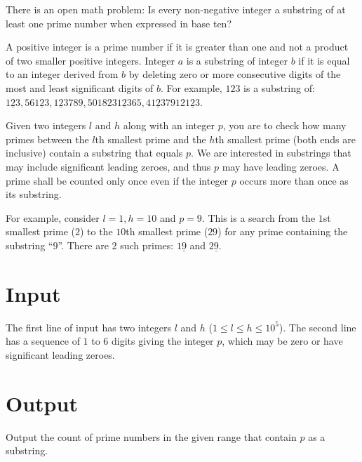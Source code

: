 
There is an open math problem: Is every non-negative integer a substring of at least one prime number when expressed in base ten?

A positive integer is a prime number if it is greater than one and not a product of two smaller positive integers.
Integer $a$ is a substring of integer $b$ if it is equal to an integer derived from $b$ by deleting zero or more consecutive digits of the most and least significant digits of $b$.
For example, $123$ is a substring of: $\underline{123}, 56\underline{123}, \underline{123}789, 501823\underline{123}65, 4\underline{123}7912\underline{123}$.

Given two integers $l$ and $h$ along with an integer $p$, 
you are to check how many primes between the $l$th smallest prime and the $h$th smallest prime (both ends are inclusive) contain a substring that equals $p$.
We are interested in substrings that may include significant leading zeroes, and thus $p$ may have leading zeroes.
A prime shall be counted only once even if the integer $p$ occurs more than once as its substring.

For example, consider $l = 1, h = 10$ and $p = 9$. This is a search from the $1$st smallest prime ($2$) to the $10$th smallest prime ($29$) for any prime containing the substring ``$9$''.
There are $2$ such primes: $1\underline{9}$ and $2\underline{9}$.


\section*{Input}
The first line of input has two integers $l$ and $h$ ($1 \leq l \leq h \leq 10^5$).
The second line has a sequence of $1$ to $6$ digits giving the integer $p$, which may be zero or have significant leading zeroes.

\section*{Output}
Output the count of prime numbers in the given range that contain $p$ as a substring.
